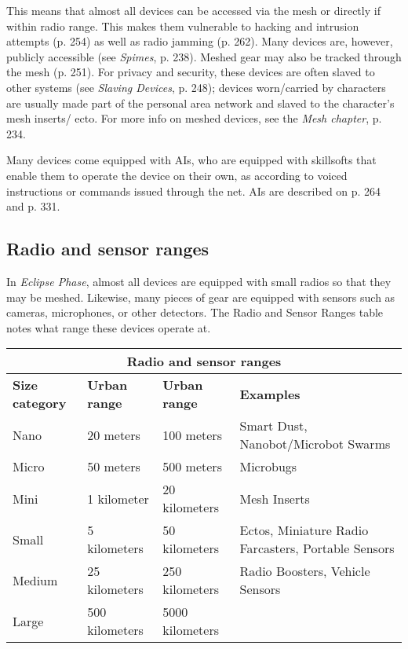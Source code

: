 This means that almost all devices can be accessed
via the mesh or directly if within radio range. This
makes them vulnerable to hacking and intrusion attempts
(p. 254) as well as radio jamming (p. 262).
Many devices are, however, publicly accessible (see
\emph{Spimes}, p. 238). Meshed gear may also be tracked
through the mesh (p. 251). For privacy and security,
these devices are often slaved to other systems (see
\emph{Slaving Devices}, p. 248); devices worn/carried by
characters are usually made part of the personal area
network and slaved to the character’s mesh inserts/
ecto. For more info on meshed devices, see the \emph{Mesh
chapter}, p. 234.

Many devices come equipped with AIs, who are
equipped with skillsofts that enable them to operate
the device on their own, as according to voiced
instructions or commands issued through the net. AIs
are described on p. 264 and p. 331.


\subsection{Radio and sensor ranges}
\label{sec:radio-sensor-ranges}

In \emph{Eclipse Phase}, almost all devices are equipped with
small radios so that they may be meshed. Likewise,
many pieces of gear are equipped with sensors such as
cameras, microphones, or other detectors. The Radio
and Sensor Ranges table notes what range these devices
operate at.

\begin{table}
\begin{tabularx}{\textwidth}{|l|l|l|X|}
\hline
\multicolumn{4}{|c|}{\textbf{Radio and sensor ranges}}			\\
\hline
\textbf{Size category}	& \textbf{Urban range}	& \textbf{Urban range}	& \textbf{Examples} \\
\hline
Nano 				& 20 meters 			& 100 meters			& Smart Dust, Nanobot/Microbot Swarms \\
Micro				& 50 meters			& 500 meters			& Microbugs \\
Mini					& 1 kilometer			& 20 kilometers		& Mesh Inserts \\
Small				& 5 kilometers			& 50 kilometers		& Ectos, Miniature Radio Farcasters, Portable Sensors \\
Medium				& 25 kilometers		& 250 kilometers		& Radio Boosters, Vehicle Sensors \\
Large				& 500 kilometers		& 5000 kilometers		& \\
\hline
\end{tabularx}
\label{tab:radio-sensor-ranges}
\end{table}


